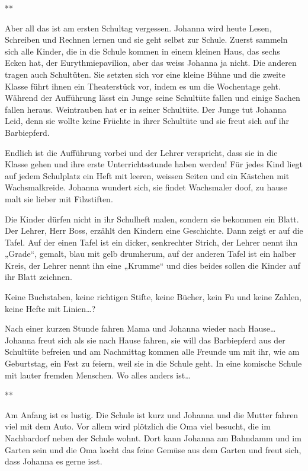 \documentclass[10pt,a5paper]{book}
\newcommand{\sterne}{\par{\centering ***\par}}
\begin{document}
\sterne

Aber all das ist am ersten Schultag vergessen. Johanna wird heute Lesen, Schreiben und Rechnen lernen und sie geht selbst zur Schule.
Zuerst sammeln sich alle Kinder, die in  die Schule kommen in einem kleinen Haus, das sechs Ecken hat, der Eurythmiepavilion, aber das weiss Johanna ja nicht. Die anderen tragen auch Schultüten. Sie setzten sich vor eine kleine Bühne und die zweite Klasse führt ihnen ein Theaterstück vor, indem es um die Wochentage geht. Während der Aufführung lässt ein Junge seine Schultüte fallen und einige Sachen fallen heraus. Weintrauben hat er in seiner Schultüte. Der Junge tut Johanna Leid, denn sie wollte keine Früchte in ihrer Schultüte und sie freut sich auf ihr Barbiepferd.

Endlich ist die Aufführung vorbei und der Lehrer verspricht, dass sie in die Klasse gehen und ihre erste Unterrichtsstunde haben werden! Für jedes Kind liegt auf jedem Schulplatz ein Heft mit leeren, weissen Seiten und ein Kästchen mit Wachsmalkreide. Johanna wundert sich, sie findet Wachsmaler doof, zu hause malt sie lieber mit Filzstiften. 

Die Kinder dürfen nicht in ihr Schulheft malen, sondern sie bekommen ein Blatt. Der Lehrer, Herr Boss, erzählt den Kindern eine Geschichte. Dann zeigt er auf die Tafel. Auf der einen Tafel ist ein dicker, senkrechter Strich, der Lehrer nennt ihn „Grade“, gemalt, blau mit gelb drumherum, auf der anderen Tafel ist ein halber Kreis, der Lehrer nennt ihn eine „Krumme“ und dies beides sollen die Kinder auf ihr Blatt zeichnen.

Keine Buchstaben, keine richtigen Stifte, keine Bücher, kein Fu und keine Zahlen, keine Hefte mit Linien\dots?

Nach einer kurzen Stunde fahren Mama und Johanna wieder nach Hause\dots
Johanna freut sich als sie nach Hause fahren, sie will das Barbiepferd aus der Schultüte befreien und am Nachmittag kommen alle Freunde um mit ihr, wie am Geburtstag, ein Fest zu feiern, weil sie in die Schule geht. In eine komische Schule mit lauter fremden Menschen. Wo alles anders ist\dots


\sterne


Am Anfang ist es lustig. Die Schule ist kurz und Johanna und die Mutter fahren viel mit dem Auto. Vor allem wird plötzlich die Oma viel besucht, die im Nachbardorf neben der Schule wohnt. Dort kann Johanna am Bahndamm und im Garten sein und die Oma kocht das feine Gemüse aus dem Garten und freut sich, dass Johanna es gerne isst.
\end{document}
